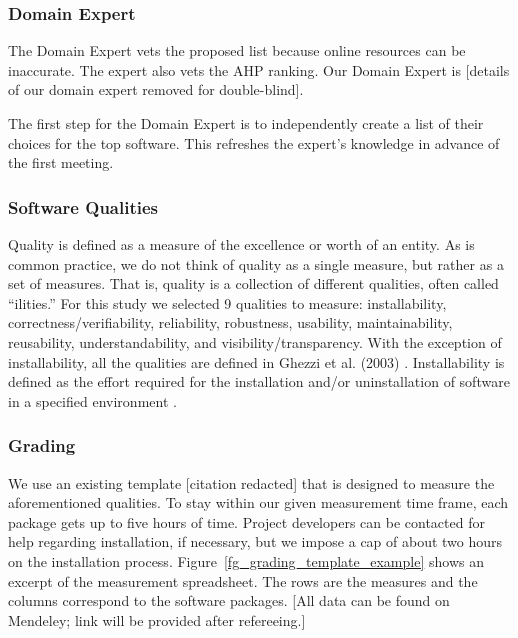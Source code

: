 \documentclass[doubleblind,12pt, 3p, times]{elsarticle}
\begin{document}
\subsubsection{Domain Expert} \label{sec_vet_software_list}

The Domain Expert vets the proposed list because online resources can be
inaccurate.  The expert also vets the AHP ranking.  Our Domain Expert is [details of our domain expert removed for double-blind].

The first step for the Domain Expert is to independently create a list of their
choices for the top software.  This refreshes the expert's knowledge in advance
of the first meeting.

\subsubsection{Software Qualities} \label{sec_software_quality}

Quality is defined as a measure of the excellence or worth of an entity.  As is
common practice, we do not think of quality as a single measure, but rather as
a set of measures.  That is, quality is a collection of different qualities,
often called ``ilities.''  For this study we selected 9 qualities to measure:
installability, correctness/verifiability, reliability, robustness, usability,
maintainability, reusability, understandability, and visibility/transparency.
With the exception of installability, all the qualities are defined in Ghezzi
et al. (2003) \cite{GhezziEtAl2003}. Installability is defined as the effort
required for the installation and/or uninstallation of software in a specified
environment \cite{ISO/IEC25010}.

\subsubsection{Grading} \label{sec_grading_software}

We use an existing template [citation redacted]
that is designed to measure the
aforementioned qualities. To stay within our given measurement time frame, each
package gets up to five hours of time.  Project developers can be contacted for
help regarding installation, if necessary, but we impose a cap of about two
hours on the installation process.  Figure~\ref{fg_grading_template_example}
shows an excerpt of the measurement spreadsheet.  The rows are the measures and
the columns correspond to the software packages.  [All data can be found on
Mendeley; link will be provided after refereeing.] 
\end{document}
